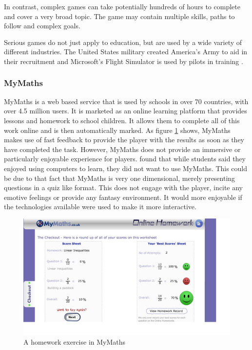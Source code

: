 \documentclass[12pt,a4paper]{report}
\begin{document}
In contrast, complex games can take potentially hundreds of hours to complete and cover a very broad topic. The game may contain multiple skills, paths to follow and complex goals.  

Serious games do not just apply to education, but are used by a wide variety of different industries. The United States military created America's Army to aid in their recruitment and Microsoft's Flight Simulator is used by pilots in training \citep{111701519980901}.


\subsubsection{MyMaths}
MyMaths is a web based service that is used by schools in over 70 countries, with over 4.5 million users. It is marketed as an online learning platform that provides lessons and homework to school children. It allows them to complete all of this work online and is then automatically marked.
As figure \ref{fig:mymaths} shows, MyMaths makes use of fast feedback to provide the player with the results as soon as they have completed the task. However, MyMaths does not provide an immersive or particularly enjoyable experience for players. \cite{lee2013learning} found that while students said they enjoyed using computers to learn, they did not want to use MyMaths. This could be due to that fact that MyMaths is very one dimensional, merely presenting questions in a quiz like format. This does not engage with the player, incite any emotive feelings or provide any fantasy environment. It would more enjoyable if the technologies available were used to make it more interactive.
\begin{figure}[!tbp]
  \centering
  \begin{minipage}[b]{1\textwidth}
    \includegraphics[width=\textwidth]{mymaths}
    \caption{A homework exercise in MyMaths}
        \label{fig:mymaths}
  \end{minipage}
\end{figure}
\FloatBarrier
\end{document}
